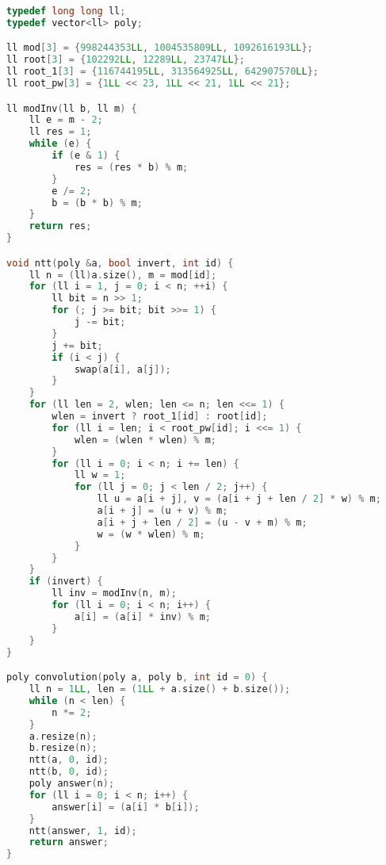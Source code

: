 \documentclass[11pt, a4paper, oneside]{book}
\begin{document}
\begin{multicols}{2}
\begin{lstlisting}[language=C++]
typedef long long ll;
typedef vector<ll> poly;

ll mod[3] = {998244353LL, 1004535809LL, 1092616193LL};
ll root[3] = {102292LL, 12289LL, 23747LL};
ll root_1[3] = {116744195LL, 313564925LL, 642907570LL};
ll root_pw[3] = {1LL << 23, 1LL << 21, 1LL << 21};

ll modInv(ll b, ll m) {
    ll e = m - 2;
    ll res = 1;
    while (e) {
        if (e & 1) {
            res = (res * b) % m;
        }
        e /= 2;
        b = (b * b) % m;
    }
    return res;
}

void ntt(poly &a, bool invert, int id) {
    ll n = (ll)a.size(), m = mod[id];
    for (ll i = 1, j = 0; i < n; ++i) {
        ll bit = n >> 1;
        for (; j >= bit; bit >>= 1) {
            j -= bit;
        }
        j += bit;
        if (i < j) {
            swap(a[i], a[j]);
        }
    }
    for (ll len = 2, wlen; len <= n; len <<= 1) {
        wlen = invert ? root_1[id] : root[id];
        for (ll i = len; i < root_pw[id]; i <<= 1) {
            wlen = (wlen * wlen) % m;
        }
        for (ll i = 0; i < n; i += len) {
            ll w = 1;
            for (ll j = 0; j < len / 2; j++) {
                ll u = a[i + j], v = (a[i + j + len / 2] * w) % m;
                a[i + j] = (u + v) % m;
                a[i + j + len / 2] = (u - v + m) % m;
                w = (w * wlen) % m;
            }
        }
    }
    if (invert) {
        ll inv = modInv(n, m);
        for (ll i = 0; i < n; i++) {
            a[i] = (a[i] * inv) % m;
        }
    }
}

poly convolution(poly a, poly b, int id = 0) {
    ll n = 1LL, len = (1LL + a.size() + b.size());
    while (n < len) {
        n *= 2;
    }
    a.resize(n);
    b.resize(n);
    ntt(a, 0, id);
    ntt(b, 0, id);
    poly answer(n);
    for (ll i = 0; i < n; i++) {
        answer[i] = (a[i] * b[i]);
    }
    ntt(answer, 1, id);
    return answer;
}
\end{lstlisting}
\end{multicols}

\hfill
\end{document}
